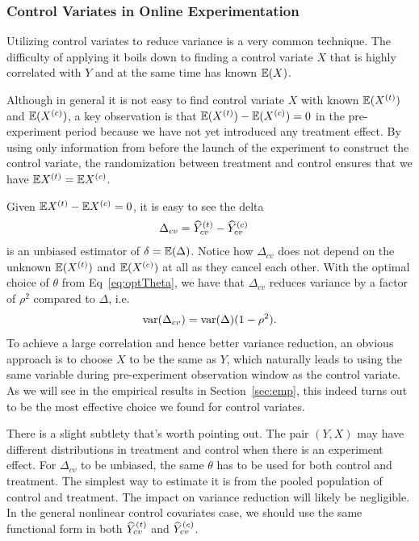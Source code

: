 \documentclass{sig-alternate}
\begin{document}
\subsubsection{Control Variates in Online Experimentation}\label{cvexp}
Utilizing control variates to reduce variance is a very common technique. The difficulty of applying it boils down to finding a control variate $X$ that is highly correlated with $Y$ and at the same time has known $\mathbb{E}(X)$. 

Although in general it is not easy to find control variate $X$ with known $\mathbb{E}(X^{(t)})$ and $\mathbb{E}(X^{(c)})$, a key observation is that $\mathbb{E}(X^{(t)})-\mathbb{E}(X^{(c)})=0$ in the pre-experiment period because we have not yet introduced any treatment effect. By using only information from before the launch of the experiment to construct the control variate, the randomization between treatment and control ensures that we have $\mathbb{E} X^{(t)}=\mathbb{E} X^{(c)}$.


Given $\mathbb{E} X^{(t)}-\mathbb{E} X^{(c)}=0$, it is easy to see the delta
\begin{align}\label{eq:cvdelta}
\Delta_{cv} &= \widehat{Y}_{cv}^{(t)} - \widehat{Y}_{cv}^{(c)}
\end{align}
is an unbiased estimator of $\delta=\mathbb{E}(\Delta)$. Notice how $\Delta_{cv}$ does not depend on the unknown $\mathbb{E} (X^{(t)})$ and $\mathbb{E} (X^{(c)})$ at all as they cancel each other. With the optimal choice of $\theta$ from Eq~\eqref{eq:optTheta}, we have that
$\Delta_{cv}$ reduces variance by a factor of $\rho^2$ compared to $\Delta$, i.e.
\begin{align*}
\mathrm{var}(\Delta_{cv}) = \mathrm{var}(\Delta)(1-\rho^2).
\end{align*}
To achieve a large correlation and hence better variance reduction, an obvious approach is to choose $X$ to be the same as $Y$, which naturally leads to using the same variable during pre-experiment observation window as the control variate. As we will see in the empirical results in Section~\ref{sec:emp}, this indeed turns out to be the most effective choice we found for control variates.  

There is a slight subtlety that's worth pointing out. The pair $(Y,X)$ may have different distributions in treatment and control when there is an experiment effect. For $\Delta_{cv}$ to be unbiased, the same $\theta$ has to be used for both control and treatment. The simplest way to estimate it is from the pooled population of control and treatment. The impact on variance reduction will likely be negligible. In the general nonlinear control covariates case, we should use the same functional form in both $\widehat{Y}_{cv}^{(t)}$ and $\widehat{Y}_{cv}^{(c)}$.
\end{document}

